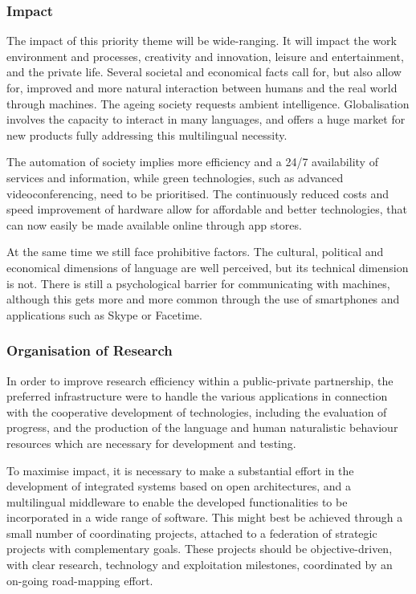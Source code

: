 \documentclass[10pt, plain]{../../metanetpaper}
\begin{document}
\begin{multicols}{2}
\subsubsection{Impact}
\label{sec:impact-pt3}

The impact of this priority theme will be wide-ranging. It will impact the work environment and processes, creativity and innovation, leisure and entertainment, and the private life. Several societal and economical facts call for, but also allow for, improved and more natural interaction between humans and the real world through machines. The ageing society requests ambient intelligence. Globalisation involves the capacity to interact in many languages, and offers a huge market for new products fully addressing this multilingual necessity.
 
The automation of society implies more efficiency and a 24/7 availability of services and information, while green technologies, such as advanced videoconferencing, need to be prioritised. The continuously reduced costs and speed improvement of hardware allow for affordable and better technologies, that can now easily be made available online through app stores.
 
At the same time we still face prohibitive factors. The cultural, political and economical dimensions of language are well perceived, but its technical dimension is not. There is still a psychological barrier for communicating with machines, although this gets more and more common through the use of smartphones and applications such as Skype or Facetime.

\subsubsection{Organisation of Research}
\label{sec:organ-rese-pt3}

In order to improve research efficiency within a public-private partnership, the preferred infrastructure were to handle the various applications in connection with the cooperative development of technologies, including the evaluation of progress, and the production of the language and human naturalistic behaviour resources which are necessary for development and testing.
 
To maximise impact, it is necessary to make a substantial effort in the development of integrated systems based on open architectures, and a multilingual middleware to enable the developed functionalities to be incorporated in a wide range of software. This might best be achieved through a small number of coordinating projects, attached to a federation of strategic projects with complementary goals. These projects should be objective-driven, with clear research, technology and exploitation milestones, coordinated by an on-going road-mapping effort.
 

\end{multicols}
\end{document}
